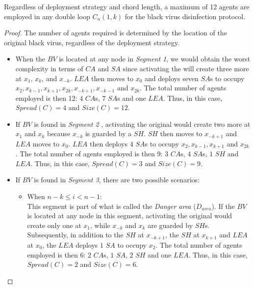 \begin{theorem}\label{theo:agents}
Regardless of deployment strategy and chord length, a maximum of 12 agents are employed  in any double loop $C_n(1,k)$ for the black virus disinfection protocol.
\end{theorem}
\begin{proof}
The number of agents required is determined by the location of the original black virus, regardless of the deployment strategy.
\begin{itemize} 
\item
When the $BV$ is located at any node in  {\em Segment 1}, we would obtain  the worst complexity in terms of $CA$ and $SA$ since activating the \bv will create three more \bvs at $x_{1}$, $x_{k}$, and $ x_{-k}$. $LEA$ then  moves to $x_{0}$ and deploys seven  $SA$s to occupy $x_{2},x_{k-1},x_{k+1},x_{2k},x_{-k+1},x_{-k-1}$ and $x_{2k}$. The total number of agents employed is then 12:  $4$ $CA$s, $7$  $SA$s and one $LEA$. Thus, in this case,  $Spread(C)=4$ and $Size(C)=12$.   
 
\item If $BV$ is found in  {\em  Segment 2 },
activating the original \bv would create two more \bvs at $x_{1}$ and $ x_{k}$ because $x_{-k}$ is guarded by a $SH$. $SH$ then moves to $x_{-k+1}$  and $LEA$ moves to $x_{0}$. $LEA$ then deploys $4$  $SA$s to occupy $x_{2},x_{k-1},x_{k+1}$ and $x_{2k}$. The total number of agents employed is then 9: $3$ $CA$s, $4$  $SA$s, $1$ $SH$ and $LEA$. Thus, in this case,  $Spread(C)=3$ and $Size(C)=9$.
 
\item If $BV$ is found in  {\em Segment 3}, there are two possible scenarios:

\begin{itemize}
\item 
When $n-k \leq i < n-1$:\\ %
This segment is part of what is called  the {\it Danger area} ($D_{area}$).
If the $BV$ is located at any node in this segment, activating the original \bv would create only one \bv at $x_{1}$, while $x_{-k}$ and $x_{k}$ are guarded by $SH$s. Subsequently, in addition to the $SH$ at $x_{-k+1}$, the $SH$ at $x_{k+1}$ and $LEA$ at $x_{0}$, the $LEA$ deploys $1$  $SA$ to occupy $x_{2}$. The total number of agents employed is then 6: $2$ $CA$s, $1$  $SA$, $2$ $SH$ and one $LEA$. Thus, in this case,  $Spread(C)=2$ and $Size(C)=6$.



\end{itemize}
\end{itemize}
\end{proof}
